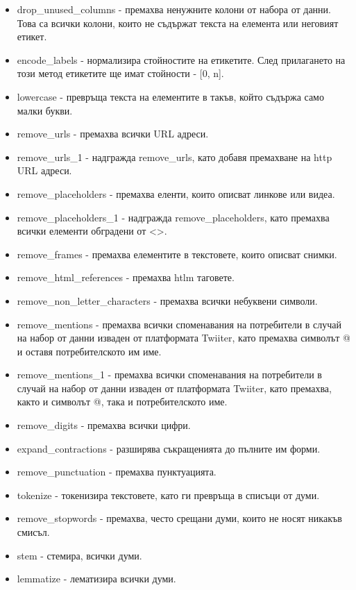 \documentclass{article}
\begin{document}
\begin{itemize}

  \item drop\_unused\_columns - премахва ненужните колони от набора от данни. Това са всички колони, които не съдържат
  текста на елемента или неговият етикет.
  \item encode\_labels - нормализира стойностите на етикетите. След прилагането на този метод етикетите ще имат
  стойности - [0, n].
  \item lowercase - превръща текста на елементите в такъв, който съдържа само малки букви.
  \item remove\_urls - премахва всички URL адреси.
  \item remove\_urls\_1 - надгражда remove\_urls, като добавя премахване на http URL адреси.
  \item remove\_placeholders - премахва еленти, които описват линкове или видеа.
  \item remove\_placeholders\_1 - надгражда remove\_placeholders, като премахва всички елементи обградени от <>.
  \item remove\_frames - премахва елементите в текстовете, които описват снимки.
  \item remove\_html\_references - премахва htlm таговете.
  \item remove\_non\_letter\_characters - премахва всички небуквени символи.
  \item remove\_mentions - премахва всички споменавания на потребители в случай на набор от данни изваден от
  платформата Twiiter, като премахва символът @ и оставя потребителското им име.
  \item remove\_mentions\_1 - премахва всички споменавания на потребители в случай на набор от данни изваден от
  платформата Twiiter, като премахва, както и символът @, така и потребителското име.
  \item remove\_digits - премахва всички цифри.
  \item expand\_contractions - разширява съкращенията до пълните им форми.
  \item remove\_punctuation - премахва пунктуацията.
  \item tokenize - токенизира текстовете, като ги превръща в списъци от думи.
  \item remove\_stopwords - премахва, често срещани думи, които не носят никакъв смисъл.
  \item stem - стемира, всички думи.
  \item lemmatize - лематизира всички думи.

\end{itemize}
\end{document}
